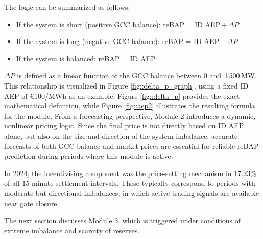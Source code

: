 \documentclass[class=scrbook, crop=false]{standalone}
\begin{document}
The logic can be summarized as follows:
\begin{itemize}
\item If the system is short (positive GCC balance):
 reBAP = ID AEP + $\Delta P$
\item If the system is long (negative GCC balance):
 reBAP = ID AEP − $\Delta P$
\item If the system is balanced:
 reBAP = ID AEP
\end{itemize}

$\Delta P$ is defined as a linear function of the GCC balance between 0 and ±500 MW. This relationship is visualized in Figure \ref{fig::delta_p_graph}, using a fixed ID AEP of €100/MWh as an example. Figure \ref{fig::delta_p} provides the exact mathematical definition, while Figure \ref{fig::aep2} illustrates the resulting formula for the module.
From a forecasting perspective, Module 2 introduces a dynamic, nonlinear pricing logic. Since the final price is not directly based on \gls{ID AEP} alone, but also on the size and direction of the system imbalance, accurate forecasts of both \gls{GCC} balance and market prices are essential for reliable reBAP prediction during periods where this module is active.

In 2024, the incentivising component was the price-setting mechanism in 17.23\% of all 15-minute settlement intervals. These typically correspond to periods with moderate but directional imbalances, in which active trading signals are available near gate closure.

The next section discusses Module 3, which is triggered under conditions of extreme imbalance and scarcity of reserves.

\end{document}
